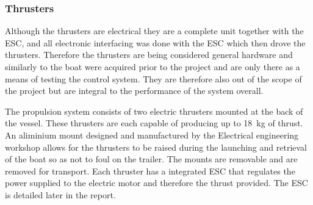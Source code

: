 		\subsubsection{Thrusters}
		Although the thrusters are electrical they are a complete unit together with the ESC, and all electronic interfacing was done with the ESC which then drove the thrusters. Therefore the thrusters are being considered general hardware and similarly to the boat were acquired prior to the project and are only there as a means of testing the control system. They are therefore also out of the scope of the project but are integral to the performance of the system overall.\par 
		The propulsion system consists of two electric thrusters mounted at the back of the vessel. These thrusters are each capable of producing up to \SI{18}{\kilogram} of thrust. An aliminium mount designed and manufactured by the Electrical engineering workshop allows for the thrusters to be raised during the launching and retrieval of the boat so as not to foul on the trailer. The mounts are removable and are removed for transport. Each thruster has a integrated ESC that regulates the power supplied to the electric motor and therefore the thrust provided. The ESC is detailed later in the report.
